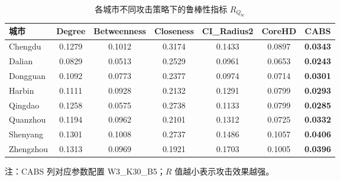 \begin{table}[htbp]
  \centering
  \caption{各城市不同攻击策略下的鲁棒性指标 $R_{Q_{bc}}$}
  \label{tab:Rqbc_all}
  \begin{tabular}{lcccccc}
    \toprule
    \textbf{城市} & \textbf{Degree} & \textbf{Betweenness} & \textbf{Closeness}
      & \textbf{CI\_Radius2} & \textbf{CoreHD} & \textbf{CABS} \\
    \midrule
    Chengdu   & 0.1279 & 0.1012 & 0.3174 & 0.1433 & 0.0897 & \textbf{0.0343} \\
    Dalian    & 0.0829 & 0.0513 & 0.2529 & 0.0961 & 0.0653 & \textbf{0.0243} \\
    Dongguan  & 0.1092 & 0.0773 & 0.2377 & 0.0974 & 0.0714 & \textbf{0.0301} \\
    Harbin    & 0.1111 & 0.0928 & 0.2132 & 0.1291 & 0.0799 & \textbf{0.0293} \\
    Qingdao   & 0.1258 & 0.0575 & 0.2738 & 0.1133 & 0.0799 & \textbf{0.0285} \\
    Quanzhou  & 0.1194 & 0.0962 & 0.2101 & 0.1312 & 0.0725 & \textbf{0.0332} \\
    Shenyang  & 0.1301 & 0.1008 & 0.2737 & 0.1486 & 0.1057 & \textbf{0.0406} \\
    Zhengzhou & 0.1313 & 0.0969 & 0.1921 & 0.1703 & 0.1005 & \textbf{0.0396} \\
    \bottomrule
  \end{tabular}
  \begin{minipage}{\linewidth}
    \vspace{2pt}
    \footnotesize 注：CABS 列对应参数配置 W3\_K30\_B5；\(R\) 值越小表示攻击效果越强。
  \end{minipage}
\end{table}

